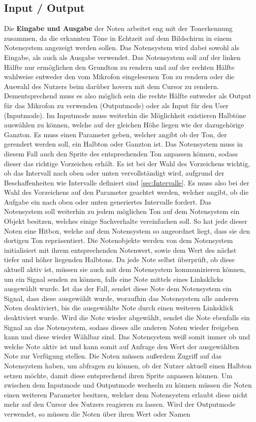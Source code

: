 \subsection{Input / Output}
Die \textbf{Eingabe und Ausgabe} der Noten arbeitet eng mit der Tonerkennung zusammen, da die erkannten Töne in Echtzeit auf dem Bildschirm in einem Notensystem angezeigt werden sollen. Das Notensystem wird dabei sowohl als Eingabe, als auch als Ausgabe verwendet. Das Notensystem soll auf der linken Hälfte nur ermöglichen den Grundton zu rendern und auf der rechten Hälfte wahlweise entweder den vom Mikrofon eingelesenen Ton zu rendern oder die Auswahl des Nutzers beim darüber hovern mit dem Cursor zu rendern. Dementsprechend muss es also möglich sein die rechte Hälfte entweder als Output für das Mikrofon zu verwenden (Outputmode) oder als Input für den User (Inputmode). Im Inputmode muss weiterhin die Möglichkeit existieren Halbtöne auswählen zu können, welche auf der gleichen Höhe liegen wie der dazugehörige Ganzton. Es muss einen Parameter geben, welcher angibt ob der Ton, der gerendert werden soll, ein Halbton oder Ganzton ist. Das Notensystem muss in diesem Fall auch den Sprite des entsprechenden Ton anpassen können, sodass dieser das richtige Vorzeichen erhält. Es ist bei der Wahl des Vorzeichens wichtig, ob das Intervall nach oben oder unten vervollständigt wird, aufgrund der Beschaffenheiten wie Intervalle definiert sind \ref{sec:Intervalle}. Es muss also bei der Wahl des Vorzeichens auf den Parameter geachtet werden, welcher angibt, ob die Aufgabe ein nach oben oder unten generiertes Intervalle fordert. Das Notensystem soll weiterhin zu jedem möglichen Ton auf dem Notensystem ein Objekt besitzen, welches einige Sachverhalte vereinfachen soll. So hat jede dieser Noten eine Hitbox, welche auf dem Notensystem so angeordnet liegt, dass sie den dortigen Ton repräsentiert. Die Notenobjekte werden von dem Notensystem initialisiert mit ihrem entsprechenden Notenwert, sowie dem Wert des nächst tiefer und höher liegenden Halbtons. Da jede Note selbst überprüft, ob diese aktuell aktiv ist, müssen sie auch mit dem Notensystem kommunizieren können, um ein Signal senden zu können, falls eine Note mittels eines Linksklicks ausgewählt wurde. Ist das der Fall, sendet diese Note dem Notensystem ein Signal, dass diese ausgewählt wurde, woraufhin das Notensystem alle anderen Noten deaktiviert, bis die ausgewählte Note durch einen weiteren Linksklick deaktiviert wurde. Wird die Note wieder abgewählt, sendet die Note ebenfalls ein Signal an das Notensystem, sodass dieses alle anderen Noten wieder freigeben kann und diese wieder Wählbar sind. Das Notensystem weiß somit immer ob und welche Note aktiv ist und kann somit auf Anfrage den Wert der ausgewählten Note zur Verfügung stellen. Die Noten müssen außerdem Zugriff auf das Notensystem haben, um abfragen zu können, ob der Nutzer aktuell einen Halbton setzen möchte, damit diese entsprechend ihren Sprite anpassen können. Um zwischen dem Inputmode und Outputmode wechseln zu können müssen die Noten einen weiteren Parameter besitzen, welcher dem Notensystem erlaubt diese nicht mehr auf den Cursor des Nutzers reagieren zu lassen. Wird der Outputmode verwendet, so müssen die Noten über ihren Wert oder Namen 
